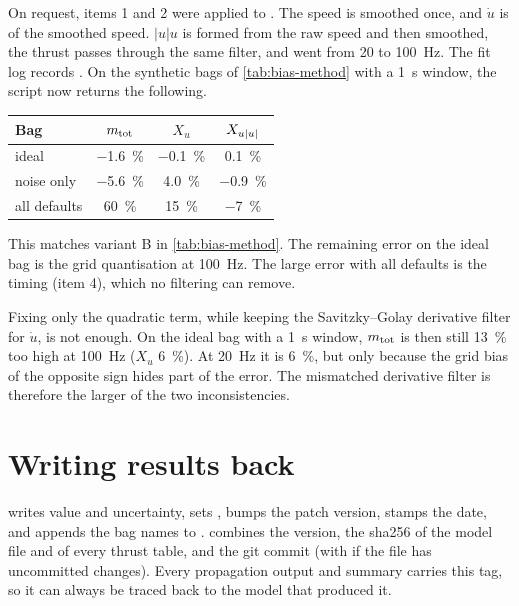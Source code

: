 \begin{revised}[title={Applied to \file{fit_surge.py}, 16 October 2026}]
On request, items 1 and 2 were applied to . The speed is smoothed once, and
$\dot u$ is  of the smoothed speed. $|u|u$ is formed from the raw speed and
then smoothed, the thrust passes through the same filter, and  went from 20 to
\qty{100}{\hertz}. The fit log records . On the synthetic bags of
\cref{tab:bias-method} with a \qty{1}{\second} window, the script now returns the following.
\begin{center}
\small
\begin{tabular}{@{}lccc@{}}
\toprule
Bag & $m_\mathrm{tot}$ & $X_u$ & $X_{u|u|}$ \\
\midrule
ideal        & \qty{-1.6}{\percent} & \qty{-0.1}{\percent} & \qty{+0.1}{\percent} \\
noise only   & \qty{-5.6}{\percent} & \qty{+4.0}{\percent} & \qty{-0.9}{\percent} \\
all defaults & \qty{+60}{\percent}  & \qty{+15}{\percent}  & \qty{-7}{\percent} \\
\bottomrule
\end{tabular}
\end{center}
This matches variant B in \cref{tab:bias-method}. The remaining error on the ideal bag is the
grid quantisation at \qty{100}{\hertz}. The large error with all defaults is the timing (item 4),
which no filtering can remove.

Fixing only the quadratic term, while keeping the Savitzky--Golay derivative filter for $\dot u$,
is not enough. On the ideal bag with a \qty{1}{\second} window, $m_\mathrm{tot}$ is then still
\qty{13}{\percent} too high at \qty{100}{\hertz} ($X_u$ \qty{+6}{\percent}). At
\qty{20}{\hertz} it is \qty{+6}{\percent}, but only because the grid bias of the opposite sign
hides part of the error. The mismatched derivative filter is therefore the larger of the two
inconsistencies.
\end{revised}

\section{Writing results back}

 writes
value and uncertainty, sets , bumps the patch version, stamps the
date, and appends the bag names to .  combines
the version, the sha256 of the model file and of every thrust table, and the git commit
(with  if the file has uncommitted changes). Every propagation output and summary carries
this tag, so it can always be traced back to the model that produced it.


